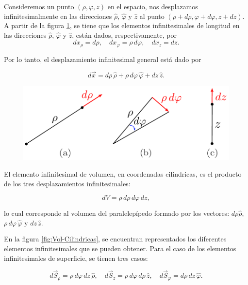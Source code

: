 Consideremos un punto $(\rho, \varphi, z)$ en el espacio, nos desplazamos infinitesimalmente en las direcciones $\hat{\rho}$, $\hat{\varphi}$ y $\hat{z}$ al punto $(\rho + d\rho, \varphi + d\varphi, z + dz)$. A partir de la figura \ref{fig:Elemento-Cilindrica}, se tiene que los elementos infinitesimales de longitud en las direcciones $\hat{\rho}$, $\hat{\varphi}$ y $\hat{z}$, están dados, respectivamente, por
\begin{equation}
dx_{\rho} = d\rho, \quad dx_{\varphi} = \rho \,d\varphi, \quad dx_z = dz.
\end{equation}

Por lo tanto, el desplazamiento infinitesimal general está dado por
\begin{shaded}
\begin{equation}
d\Vec{x} = d\rho \, \hat{\rho} + \rho \,d\varphi \,\hat{\varphi} + dz \,\hat{z}.
\end{equation}
\end{shaded}

\begin{figure}[H]
    \centering
    \includegraphics[scale = 0.7]{Figuras/Elemento-Cilindrica.pdf}
    \caption{}
    \label{fig:Elemento-Cilindrica}
\end{figure}

El elemento infinitesimal de volumen, en coordenadas cilíndricas, es el producto de los tres desplazamientos infinitesimales:
\begin{shaded}
\begin{equation}
dV = \rho \,d\rho\,d\varphi\,dz,
\end{equation}
\end{shaded}
lo cual corresponde al volumen del paralelepípedo formado por los vectores: $d\rho \hat{\rho}$, $\rho \,d\varphi \, \hat{\varphi}$ y $dz \, \hat{z}$.

 En la figura \ref{fig:Vol-Cilindricas}, se encuentran representados los diferentes elementos infinitesimales que se pueden obtener. Para el caso de los elementos infinitesimales  de superficie, se tienen tres casos:
\begin{shaded}
\begin{equation}
d\vec{S}_{\rho} = \rho \,d\varphi \,dz \,\hat{\rho},\quad d\vec{S}_{z} = \rho \,d\varphi\, d\rho \,\hat{z},\quad d\vec{S}_{\varphi} = d\rho\, dz \,\hat{\varphi}.
\end{equation}  
\end{shaded}

